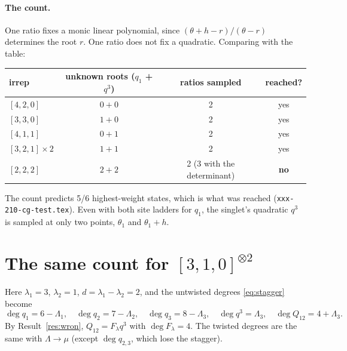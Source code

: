 \documentclass[11pt]{article}
\newcommand{\nb}[1]{\texttt{#1}}
\theoremstyle{definition}
\theoremstyle{remark}
\begin{document}
\paragraph{The count.} One ratio fixes a monic linear polynomial, since $(\theta+h-r)/(\theta-r)$ determines the root $r$. One ratio does not fix a quadratic. Comparing with the table:
\begin{center}
\begin{tabular}{lccc}\toprule
irrep & unknown roots ($q_1$ + $q^3$) & ratios sampled & reached?\\\midrule
$[4,2,0]$ & $0+0$ & 2 & yes\\
$[3,3,0]$ & $1+0$ & 2 & yes\\
$[4,1,1]$ & $0+1$ & 2 & yes\\
$[3,2,1]\times2$ & $1+1$ & 2 & yes\\
$[2,2,2]$ & $2+2$ & 2 (3 with the determinant) & \textbf{no}\\\bottomrule
\end{tabular}
\end{center}
The count predicts 5/6 highest-weight states, which is what was reached (\nb{xxx-210-cg-test.tex}). Even with both site ladders for $q_1$, the singlet's quadratic $q^3$ is sampled at only two points, $\theta_1$ and $\theta_1+h$.

\section{The same count for $[3,1,0]^{\otimes2}$}\label{sec:310}

Here $\lambda_1=3$, $\lambda_2=1$, $d=\lambda_1-\lambda_2=2$, and the untwisted degrees \eqref{eq:stagger} become
\begin{equation}
\deg q_1=6-\Lambda_1,\quad \deg q_2=7-\Lambda_2,\quad \deg q_3=8-\Lambda_3,\quad \deg q^3=\Lambda_3,\quad \deg Q_{12}=4+\Lambda_3 .
\end{equation}
By Result~\ref{res:wron}, $Q_{12}=F_\lambda q^3$ with $\deg F_\lambda=4$. The twisted degrees are the same with $\Lambda\to\mu$ (except $\deg q_{2,3}$, which lose the stagger).
\end{document}
